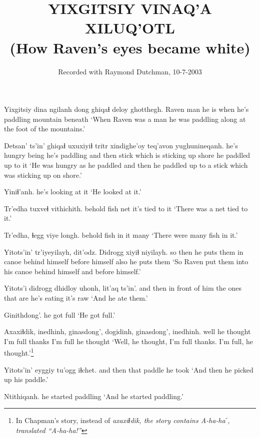 \documentclass[12pt]{article}
\begin{document}
\title{YIXGITSIY VINAQ'A XILUQ'OTL
\\(How Raven's eyes became white)}

\author{Recorded with Raymond Dutchman, 10-7-2003}
\date{}

\maketitle

\gll Yixgitsiy dina ngilanh dong ghiqaɬ  deloy  ghotthegh.
Raven  man {he is}  when {he's paddling} mountain beneath
\glt `When Raven was a man he was paddling along at the foot of the mountains.'
\glend

\gll Detsan' ts'in' ghiqaɬ  uxuxiyiɬ tritr xindighe'oy teq'avon yughunineqanh.
{he's hungry} being  {he's paddling} {and then} stick {which is sticking up} shore  {he paddled up to it}
\glt `He was hungry as he paddled and then he paddled up to a stick which was sticking up on shore.'
\glend

\gll Yiniɬ'anh.
{{he's looking at it}}
\glt `He looked at it.'
\glend

\gll Tr'edha tuxveɬ vithichith.
behold  {fish net}  {it's tied to it}
\glt `There was a net tied to it.'
\glend

\gll Tr'edha, ɬegg viye longh.
behold  fish {in it} many
\glt `There were many fish in it.'
\glend

\gll Yitots'in' tr'iyeyilayh, dit'odz. Didrogg xiyiɬ niyilayh.
{so then}  {he puts them in canoe} {behind himself} {before himself} also {he puts them}
\glt `So Raven put them into his canoe behind himself and before himself.'
\glend

\gll Yitots'i didrogg  dhidloy uhonh, lit'aq ts'in'.
{and then} {in front of him}  {the ones that are} {he's eating} {it's raw} {}
\glt `And he ate them.'
\glend

\gll Ginithdong'.
{{he got full}}
\glt `He got full.'
\glend

\gll  Axaxiɬdik, inedhinh, ginasdong', dogidinh, ginasdong', inedhinh.
well   {he thought} {I'm full}  thanks  {I'm full}  {he thought}
\glt `Well, he thought, I'm full thanks. I'm full, he thought.'\footnote{In Chapman's story, instead of \em axaxiɬdik, \em the story contains \em A-ha-haˊ, \em translated ``A-ha-ha!''}
\glend

\gll Yitots'in' eyggiy  tu'ogg  iɬchet.
{and then} that  paddle  {he took}
\glt `And then he picked up his paddle.'
\glend

\gll Ntithiqanh.
{{he started paddling}}
\glt `And he started paddling.'
\glend
\end{document}
